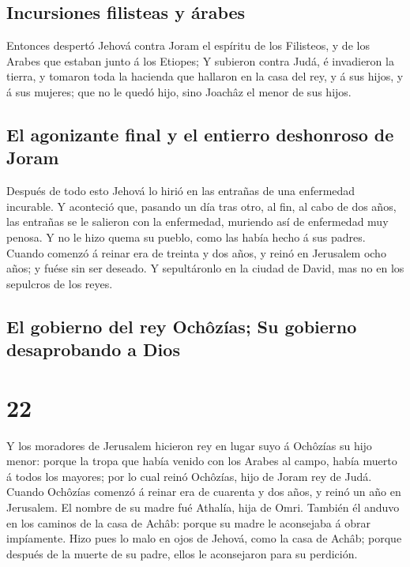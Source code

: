 \hypertarget{incursiones-filisteas-y-uxe1rabes}{%
\subsection{Incursiones filisteas y
árabes}\label{incursiones-filisteas-y-uxe1rabes}}

 Entonces despertó Jehová contra Joram el espíritu de los
Filisteos, y de los Arabes que estaban junto á los Etiopes;
 Y subieron contra Judá, é invadieron la tierra, y
tomaron toda la hacienda que hallaron en la casa del rey, y á sus hijos,
y á sus mujeres; que no le quedó hijo, sino Joachâz el menor de sus
hijos.

\hypertarget{el-agonizante-final-y-el-entierro-deshonroso-de-joram}{%
\subsection{El agonizante final y el entierro deshonroso de
Joram}\label{el-agonizante-final-y-el-entierro-deshonroso-de-joram}}

 Después de todo esto Jehová lo hirió en las entrañas de
una enfermedad incurable.  Y aconteció que, pasando un
día tras otro, al fin, al cabo de dos años, las entrañas se le salieron
con la enfermedad, muriendo así de enfermedad muy penosa. Y no le hizo
quema su pueblo, como las había hecho á sus padres. 
Cuando comenzó á reinar era de treinta y dos años, y reinó en Jerusalem
ocho años; y fuése sin ser deseado. Y sepultáronlo en la ciudad de
David, mas no en los sepulcros de los reyes.

\hypertarget{el-gobierno-del-rey-ochuxf4zuxedas-su-gobierno-desaprobando-a-dios}{%
\subsection{El gobierno del rey Ochôzías; Su gobierno desaprobando a
Dios}\label{el-gobierno-del-rey-ochuxf4zuxedas-su-gobierno-desaprobando-a-dios}}

\hypertarget{section-21}{%
\section{22}\label{section-21}}

 Y los moradores de Jerusalem hicieron rey en lugar suyo á
Ochôzías su hijo menor: porque la tropa que había venido con los Arabes
al campo, había muerto á todos los mayores; por lo cual reinó Ochôzías,
hijo de Joram rey de Judá.  Cuando Ochôzías comenzó á
reinar era de cuarenta y dos años, y reinó un año en Jerusalem. El
nombre de su madre fué Athalía, hija de Omri.  También él
anduvo en los caminos de la casa de Achâb: porque su madre le aconsejaba
á obrar impíamente.  Hizo pues lo malo en ojos de Jehová,
como la casa de Achâb; porque después de la muerte de su padre, ellos le
aconsejaron para su perdición.

